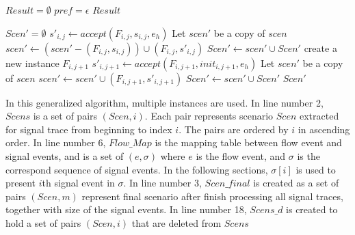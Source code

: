 \documentclass[12pt,frontmatter,copyright,thesis]{usfmanus}
\begin{document}
\begin{algorithm}[h]
\DontPrintSemicolon
$Result= \emptyset$\;
$pref=\epsilon$\;
\Return $Result $\;
\caption{$Map(\rho, h, Flow\_Map)$}
\label{map}
\end{algorithm}



\begin{algorithm}[h]
\DontPrintSemicolon
$Scen\prime = \emptyset$\;
	 {
  		 {
		$s'_{i,j} \gets \mathit{accept}(F_{i,j}, s_{i,j}, e_h) $\;
    		 {
				Let $scen'$ be a copy of $scen$\;
      		$\mathit{scen'} \gets (\mathit{scen'} - (F_{i,j}, s_{i,j})) \cup (F_{i,j}, s'_{i,j})$\;
      		$\mathit{Scen\prime} \gets \mathit{scen'} \cup \mathit{Scen'}$\;
    		}
  		}
  		 {
      	create a new instance $F_{i, j+1}$ \;
	$s'_{i,j+1}\gets\mathit{accept}(F_{i,j+1},\mathit{init}_{i,j+1}, e_h)$\;
      	 {
    			Let $scen'$ be a copy of $scen$\;
				$\mathit{scen'} \gets \mathit{scen'} \cup (F_{i,j+1}, s'_{i,j+1})$ \;
				$\mathit{Scen\prime} \gets \mathit{scen'} \cup \mathit{Scen'}$\;
      	}
    	}
	}
\Return $Scen\prime$
	
\caption{$Flow\_Analysis(\vec{F},Scen,e)$}
\label{func}
\end{algorithm}

In this generalized algorithm, multiple instances are used. 
In line number 2, $Scens$ is a set of pairs $(Scen, i)$. Each pair represents scenario $Scen$
extracted for signal trace from beginning to index $i$. The pairs are ordered
by $i$ in ascending order.
In line number 6,
$Flow\_Map$ is the mapping table between flow event and signal events, and is a set
of ${(e,\sigma)}$ where $e$ is the flow event, and $\sigma$ is the correspond sequence of
signal events. In the following sections, $\sigma[i]$ is used
to present $i$th signal event in $\sigma$.
In line number 3,
$Scen\_final$ is created as a set of pairs $(Scen, m)$ represent final scenario after finish processing all signal traces,
together with size of the signal events.
In line number 18,
 $Scens\_d$ is created to hold a set of pairs  $(Scen, i)$ that are deleted from $Scens$
\end{document}
